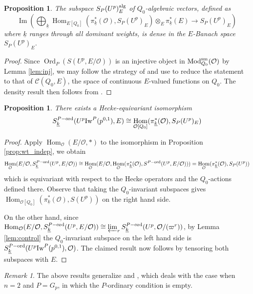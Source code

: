 \documentclass[leqno]{amsart}
\newtheorem{prop}[thm]{Proposition}
\theoremstyle{definition}
\theoremstyle{remark}
\newtheorem{rem}[thm]{Remark}
\newcommand{\oo}{\mathcal{O}}
\DeclareMathOperator{\Hom}{Hom}
\DeclareMathOperator{\Image}{Im}
\DeclareMathOperator{\Mod}{\textnormal{Mod}}
\DeclareMathOperator{\Ord}{Ord} %
\newcommand{\sm}{\textnormal{sm}}
\newcommand{\wt}[1]{\underline{ #1 }}
\newcommand{\Iw}{\textnormal{Iw}} %
\newcommand{\ord}{\textnormal{ord}} %
\begin{document}
\begin{prop}\label{prop:density}
The subspace $S_P(U^p)_E^{\textnormal{alg}}$ 
of $Q_0$-algebraic vectors, defined as
\[
\Image\left(\bigoplus_{\wt{k}}\Hom_{E[Q_0]}(\pi_{\wt{k}}^*(\oo), S_P(U^p)_E)
\otimes_E \pi_{\wt{k}}^*(E)\rightarrow S_P(U^p)_E\right)
\]
where $\wt{k}$ ranges through all dominant weights,
is dense in the $E$-Banach space $S_P(U^p)_E$.
\end{prop}
\begin{proof}
	Since $\Ord_P(S(U^p,E/\oo))$ is an injective object
	in $\Mod_{Q_0}^{\sm}(\oo)$
	by Lemma \ref{lem:inj},
	we may follow the strategy of 
	\cite[Prop 3.2.9]{pan}
	and use \cite[Cor 3.2.6]{pan}
	to reduce the statement to that of
	$\mathcal{C}(Q_0,E)$,
	the space of continuous  $E$-valued
	functions on $Q_0$.
	The density result then follows from
	\cite[Prop 6.A.17]{Pask14}.
\end{proof}


\begin{prop}\label{prop:wt_space}
	There exists a Hecke-equivariant isomorphism
	\[
	S_{\wt{k}}^{P-\ord}(U^p\Iw^P(p^{0,1}),E)\cong 
	\Hom_{\oo[Q_0]}(\pi_{\wt{k}}^*(\oo), S_P(U^p)_E)
	\]
\end{prop}
\begin{proof}
    Apply $\Hom_\oo(E/\oo,*)$ to the  isomorphism 
    in Proposition \ref{prop:wt_indep},
    we obtain 
	\[
		\Hom_\oo(E/\oo, S_{\wt{k}}^{P-\ord}(U^p,E/\oo))\cong 
		\Hom_\oo(E/\oo,
		\Hom_{\oo}(\pi_{\wt{k}}^*(\oo),
		S^{P-\ord}(U^p,E/\oo)))=
		\Hom_{\oo}(\pi_{\wt{k}}^*(\oo), S_P(U^p))
	\]
	which is equivariant with respect to 
	the Hecke operators and the $Q_0$-actions defined there.
    Observe that 
	taking the $Q_0$-invariant subspaces gives
	$\Hom_{\oo[Q_0]}(\pi_{\wt{k}}^*(\oo), S(U^p))$
	on the right hand side.

	On the other hand, since
	$\Hom_\oo(E/\oo, S_{\wt{k}}^{P-\ord}(U^p,E/\oo))\cong
	\varprojlim_r S_{\wt{k}}^{P-\ord}(U^p,\oo/(\varpi^r))$,
	by Lemma \ref{lem:control}
	the $Q_0$-invariant subspace 
	on the left hand side
	is $S_{\wt{k}}^{P-\ord}(U^p\Iw^P(p^{0,1}),\oo)$.
	The claimed result now follows by
	tensoring both subspaces with $E$.
\end{proof}

\begin{rem}
	The above results generalize
	\cite[Prop 3.2.9]{pan} and 
	\cite[\S 3.2.10]{pan},
	which deals with the case 
	when $n=2$ and $P=G_p$,
	in which the $P$-ordinary condition is empty.
\end{rem}
\end{document}
